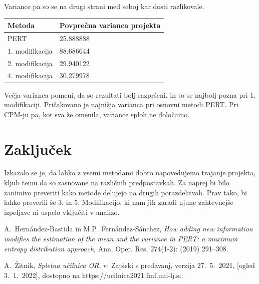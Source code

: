 \documentclass[12pt, a4paper]{article}
\begin{document}
Variance pa so se na drugi strani med seboj kar dosti razlikovale.
\begin{center}
\begin{tabular}{| l | l |}
\hline
Metoda & Povprečna varianca projekta \\
\hline
PERT & 25.888888 \\
\hline
$1$. modifikacija & 88.686644 \\
\hline
$2$. modifikacija & 29.940122 \\
\hline
$4$. modifikacija & 30.279978 \\
\hline
\end{tabular}
\end{center}
Večja varianca pomeni, da so rezultati bolj razpršeni, in to se najbolj pozna pri 1. modifikaciji. Pričakovano je najnižja varianca pri osnovni metodi PERT. Pri CPM-ju pa, kot sva že omenila, variance sploh ne določamo.

\section{Zaključek}
Izkazalo se je, da lahko z vsemi metodami dobro napovedujemo trajanje projekta, kljub temu da so zasnovane na različnih predpostavkah. Za naprej bi bilo zanimivo preveriti kako metode delujejo na drugih porazdelitvah. Prav tako, bi lahko preverili še 3. in 5. Modifikacijo, ki nam jih zaradi njune zahtevnejše izpeljave ni uspelo vključiti v analizo.


\newpage{}

\begin{thebibliography}{9}
A.~Hernández-Bastida in M.P.~Fernández-Sánchez, \emph{How adding new information modifies the estimation of
the mean and the variance in PERT: a maximum entropy distribution approach}, Ann. Oper. Res. 274(1-2): (2019) 291--308.

A.~Žitnik, \emph{Spletna učilnica OR}, v: Zapiski s predavanj, verzija 27.~5.~2021, [ogled 3.~1.~2022], dostopno na {https://ucilnica2021.fmf.uni-lj.si}.

\end{thebibliography}
\end{document}
